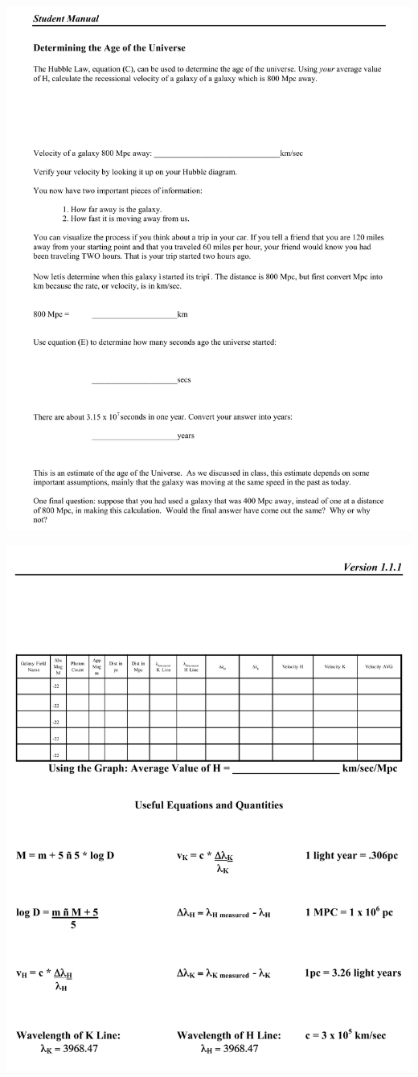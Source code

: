 \includegraphics[width=\textwidth]{hubble/hubble8.pdf}
\vfil\eject

\includegraphics[width=\textwidth]{hubble/hubble9.pdf}

\vfil\eject

